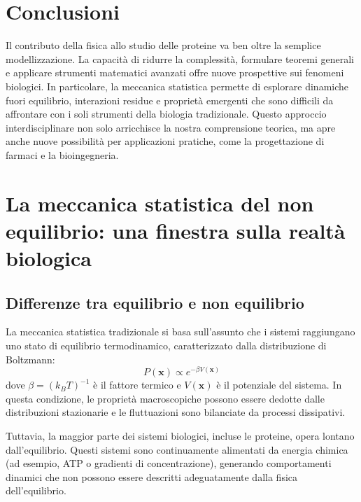 \documentclass[Lau,binding=0.6cm,oneside,noexaminfo]{sapthesis}
\begin{document}
\section{Conclusioni}
Il contributo della fisica allo studio delle proteine va ben oltre la semplice modellizzazione. La capacità di ridurre la complessità, formulare teoremi generali e applicare strumenti matematici avanzati offre nuove prospettive sui fenomeni biologici. In particolare, la meccanica statistica permette di esplorare dinamiche fuori equilibrio, interazioni residue e proprietà emergenti che sono difficili da affrontare con i soli strumenti della biologia tradizionale. Questo approccio interdisciplinare non solo arricchisce la nostra comprensione teorica, ma apre anche nuove possibilità per applicazioni pratiche, come la progettazione di farmaci e la bioingegneria.

\section{La meccanica statistica del non equilibrio: una finestra sulla realtà biologica}

\subsection{Differenze tra equilibrio e non equilibrio}
La meccanica statistica tradizionale si basa sull'assunto che i sistemi raggiungano uno stato di equilibrio termodinamico, caratterizzato dalla distribuzione di Boltzmann:
\[
P(\mathbf{x}) \propto e^{-\beta V(\mathbf{x})}
\]
dove \( \beta = (k_B T)^{-1} \) è il fattore termico e \( V(\mathbf{x}) \) è il potenziale del sistema. In questa condizione, le proprietà macroscopiche possono essere dedotte dalle distribuzioni stazionarie e le fluttuazioni sono bilanciate da processi dissipativi.

Tuttavia, la maggior parte dei sistemi biologici, incluse le proteine, opera lontano dall'equilibrio. Questi sistemi sono continuamente alimentati da energia chimica (ad esempio, ATP o gradienti di concentrazione), generando comportamenti dinamici che non possono essere descritti adeguatamente dalla fisica dell'equilibrio.
\end{document}
